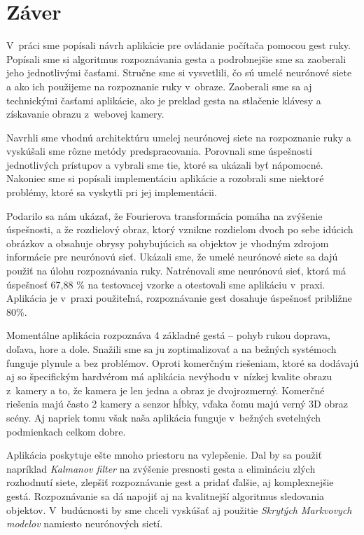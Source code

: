 \chapter*{Záver}\label{chap:conc}
{}

V~práci sme popísali návrh aplikácie pre ovládanie počítača pomocou gest ruky. Popísali sme si algoritmus rozpoznávania gesta a podrobnejšie sme sa zaoberali jeho jednotlivými časťami. Stručne sme si vysvetlili, čo sú umelé neurónové siete a ako ich použijeme na rozpoznanie ruky v~obraze. Zaoberali sme sa aj technickými časťami aplikácie, ako je preklad gesta na stlačenie klávesy a získavanie obrazu z~webovej kamery.

Navrhli sme vhodnú architektúru umelej neurónovej siete na rozpoznanie ruky a vyskúšali sme rôzne metódy predspracovania. Porovnali sme úspešnosti jednotlivých prístupov a vybrali sme tie, ktoré sa ukázali byť nápomocné. Nakoniec sme si popísali implementáciu aplikácie a rozobrali sme niektoré problémy, ktoré sa vyskytli pri jej implementácii.

Podarilo sa nám ukázať, že Fourierova transformácia pomáha na zvýšenie úspešnosti, a že rozdielový obraz, ktorý vznikne rozdielom dvoch po sebe idúcich obrázkov a obsahuje obrysy pohybujúcich sa objektov je vhodným zdrojom informácie pre neurónovú sieť. Ukázali sme, že umelé neurónové siete sa dajú použiť na úlohu rozpoznávania ruky. Natrénovali sme neurónovú sieť, ktorá má úspešnosť 67,88 \% na testovacej vzorke a otestovali sme aplikáciu v~praxi. Aplikácia je v~praxi použiteľná, rozpoznávanie gest dosahuje úspešnosť približne 80\%.

Momentálne aplikácia rozpoznáva 4 základné gestá -- pohyb rukou doprava, doľava, hore a dole. Snažili sme sa ju zoptimalizovať a na bežných systémoch funguje plynule a bez problémov. Oproti komerčným riešeniam, ktoré sa dodávajú aj so špecifickým hardvérom má aplikácia nevýhodu v~nízkej kvalite obrazu z~kamery a to, že kamera je len jedna a obraz je dvojrozmerný. Komerčné riešenia majú často 2 kamery a senzor hĺbky, vďaka čomu majú verný 3D obraz scény. Aj napriek tomu však naša aplikácia funguje v~bežných svetelných podmienkach celkom dobre.

Aplikácia poskytuje ešte mnoho priestoru na vylepšenie. Dal by sa použiť napríklad \textit{Kalmanov filter} na zvýšenie presnosti gesta a elimináciu zlých rozhodnutí siete, zlepšiť rozpoznávanie gest a pridať ďalšie, aj komplexnejšie gestá. Rozpoznávanie sa dá napojiť aj na kvalitnejší algoritmus sledovania objektov. V~budúcnosti by sme chceli vyskúšať aj použitie \textit{Skrytých Markvovych modelov} namiesto neurónových sietí.

